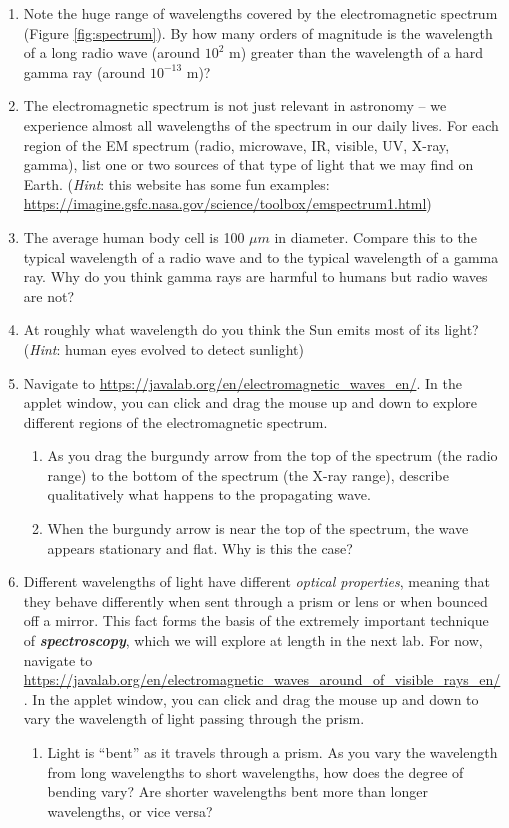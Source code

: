 \documentclass[11pt]{article}
\begin{document}
\begin{enumerate}
    \item Note the huge range of wavelengths covered by the electromagnetic spectrum (Figure \ref{fig:spectrum}). By how many orders of magnitude is the wavelength of a long radio wave (around $10^2$ m) greater than the wavelength of a hard gamma ray (around $10^{-13}$ m)? 
    
    \item The electromagnetic spectrum is not just relevant in astronomy -- we experience almost all wavelengths of the spectrum in our daily lives. For each region of the EM spectrum (radio, microwave, IR, visible, UV, X-ray, gamma), list one or two sources of that type of light that we may find on Earth. (\textit{Hint}: this website has some fun examples: \url{https://imagine.gsfc.nasa.gov/science/toolbox/emspectrum1.html})
    
    \item The average human body cell is 100 $\mu m$ in diameter. Compare this to the typical wavelength of a radio wave and to the typical wavelength of a gamma ray. Why do you think gamma rays are harmful to humans but radio waves are not?
    
    \item At roughly what wavelength do you think the Sun emits most of its light? (\textit{Hint}: human eyes evolved to detect sunlight)
    
    \item Navigate to \url{https://javalab.org/en/electromagnetic_waves_en/}. In the applet window, you can click and drag the mouse up and down to explore different regions of the electromagnetic spectrum.
    \begin{enumerate}
        \item As you drag the burgundy arrow from the top of the spectrum (the radio range) to the bottom of the spectrum (the X-ray range), describe qualitatively what happens to the propagating wave.
        
        \item When the burgundy arrow is near the top of the spectrum, the wave appears stationary and flat. Why is this the case?
    \end{enumerate}
    
    \item Different wavelengths of light have different \emph{optical properties}, meaning that they behave differently when sent through a prism or lens or when bounced off a mirror. This fact forms the basis of the extremely important technique of \textbf{\emph{spectroscopy}}, which we will explore at length in the next lab. For now, navigate to \url{https://javalab.org/en/electromagnetic_waves_around_of_visible_rays_en/}. In the applet window, you can click and drag the mouse up and down to vary the wavelength of light passing through the prism.
    \begin{enumerate}
        \item Light is ``bent'' as it travels through a prism. As you vary the wavelength from long wavelengths to short wavelengths, how does the degree of bending vary? Are shorter wavelengths bent more than longer wavelengths, or vice versa?
        

\end{enumerate}
\end{enumerate}
\end{document}
